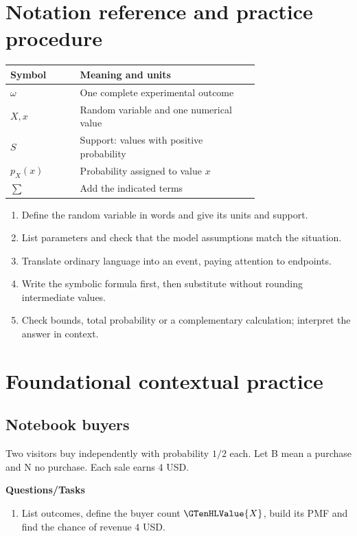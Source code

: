\section{Notation reference and practice procedure}
\begin{center}
\begin{tabular}{lp{0.72\linewidth}}
\toprule
Symbol & Meaning and units \\ \midrule
$\omega$ & One complete experimental outcome \\
$X,x$ & Random variable and one numerical value \\
$S$ & Support: values with positive probability \\
$p_X(x)$ & Probability assigned to value $x$ \\
$\sum$ & Add the indicated terms \\
\bottomrule
\end{tabular}
\end{center}
\begin{enumerate}
\item Define the random variable in words and give its units and support.
\item List parameters and check that the model assumptions match the situation.
\item Translate ordinary language into an event, paying attention to endpoints.
\item Write the symbolic formula first, then substitute without rounding intermediate values.
\item Check bounds, total probability or a complementary calculation; interpret the answer in context.
\end{enumerate}
\section{Foundational contextual practice}\label{sec:t2-c1-foundational}
\subsection{Notebook buyers}
Two visitors buy independently with probability $1/2$ each. Let B mean a purchase and N no purchase. Each sale earns 4 USD.

\textbf{Questions/Tasks}
\begin{enumerate}
\item List outcomes, define the buyer count $\GTenHLValue{X}$, build its PMF and find the chance of revenue 4 USD.
\end{enumerate}
